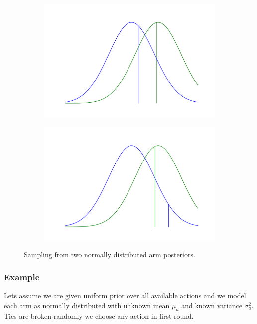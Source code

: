 \documentclass[12pt, a4paper, pdflatex, leqno]{report}
\begin{document}
\begin{figure}[htbp]
\centering
  \begin{subfigure}[b]{0.49\textwidth}
    \centering
    \includegraphics[width=0.99\linewidth]{graphics/sim1.png}
    \caption{\label{fig:sim1}}
  \end{subfigure}
  \begin{subfigure}[b]{0.49\textwidth}
    \centering
    \includegraphics[width=0.99\linewidth]{graphics/sim2.png}
    \caption{\label{fig:sim2}}
  \end{subfigure}
\begin{tiny}
\caption{Sampling from two normally distributed arm posteriors.\label{fig:sim}}
\end{tiny}
\vspace{1cm}
\end{figure}


\subsubsection{Example}
Lets assume we are given uniform prior over all available actions and we model each arm as normally distributed with unknown mean $\mu_a$ and known variance $\sigma^2_a$. Ties are broken randomly we choose any action in first round.\\
\end{document}
